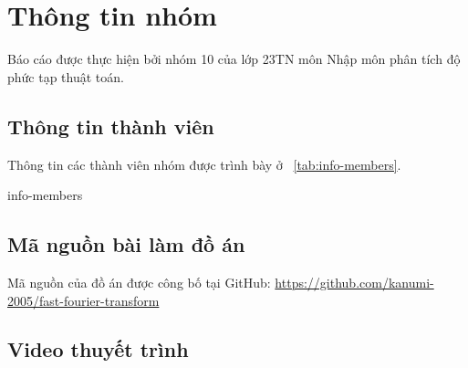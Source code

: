 \section{Thông tin nhóm}

Báo cáo được thực hiện bởi nhóm 10 của lớp 23TN môn Nhập môn phân tích độ phức
tạp thuật toán.

\subsection{Thông tin thành viên}
Thông tin các thành viên nhóm được trình bày ở
\tablename~\ref{tab:info-members}.

{info-members}

\subsection{Mã nguồn bài làm đồ án}
Mã nguồn của đồ án được công bố tại GitHub:
\url{https://github.com/kanumi-2005/fast-fourier-transform}

\subsection{Video thuyết trình}
